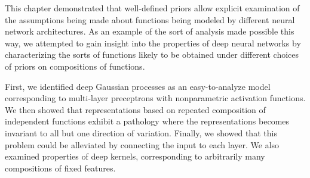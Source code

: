 This chapter demonstrated that well-defined priors allow explicit examination of the assumptions being made about functions being modeled by different neural network architectures.
As an example of the sort of analysis made possible this way, we attempted to gain insight into the properties of deep neural networks by characterizing the sorts of functions likely to be obtained under different choices of priors on compositions of functions.

First, we identified deep Gaussian processes as an easy-to-analyze model corresponding to multi-layer preceptrons with nonparametric activation functions.
%
We then showed that representations based on repeated composition of independent functions exhibit a pathology where the representations becomes invariant to all but one direction of variation. %
Finally, we showed that this problem could be alleviated by connecting the input to each layer.
%
We also examined properties of deep kernels, corresponding to arbitrarily many compositions of fixed features.

